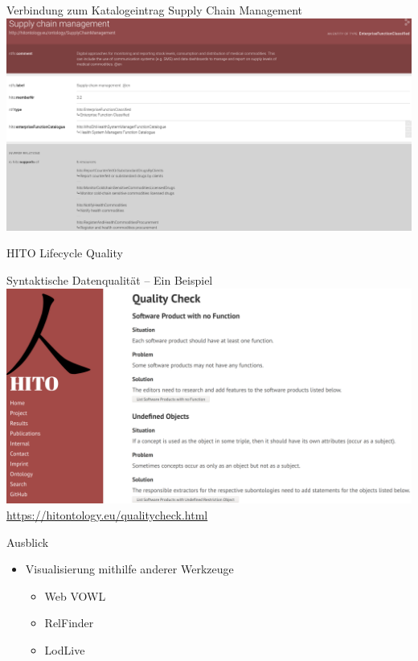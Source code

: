 \documentclass[aspectratio=1610,12pt]{beamer}
\newcommand{\enquote}[1]{{\glqq#1\grqq{}}}
\begin{document}
\begin{frame}{Verbindung zum Katalogeintrag \enquote{Supply Chain Management}}
  \vspace{-0.5cm}
  \includegraphics[width=\textwidth]{img/supplychainmanagement.png}
\end{frame}

\begin{frame}{HITO Lifecycle Quality}
  \centering
  \vspace{-0.5cm}
\end{frame}

\begin{frame}{Syntaktische Datenqualität -- Ein Beispiel}
  \vspace{-0.3cm}
  \centering
  \includegraphics[height=.75\textheight]{img/qualitychecker.png}
  \footnotesize{\url{https://hitontology.eu/qualitycheck.html}}
\end{frame}

\begin{frame}{Ausblick}
\begin{spacing}{1.5}
\begin{itemize}
  \item Visualisierung mithilfe anderer Werkzeuge
  \begin{itemize}
    \item Web VOWL
    \item RelFinder
    \item LodLive
  \end{itemize}
\end{itemize}
\end{spacing}
\end{frame}
\end{document}
